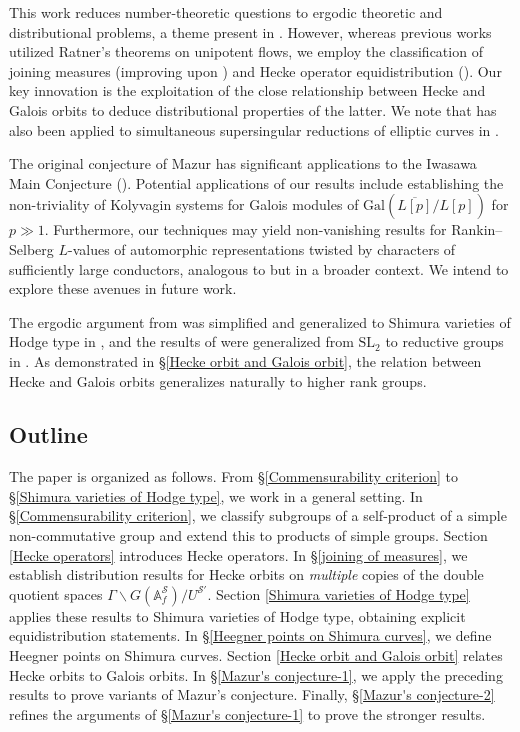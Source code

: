 \documentclass[11pt,oneside,reqno]{amsart}
\newcommand{\Gal}{\mathrm{Gal}}
\newcommand{\A}{\mathbb{A}}
\newcommand{\Scal}{\mathcal{S}}
\theoremstyle{plain}
\begin{document}
	This work reduces number-theoretic questions to ergodic theoretic and distributional problems, a theme present in \cite{Cornut2002,Vatsal2002,CornutVatsal2005,CornutVatsal2007}. However, whereas previous works utilized Ratner's theorems on unipotent flows, we employ the classification of joining measures (improving upon \cite{EinsiedlerLindenstrauss2019}) and Hecke operator equidistribution (\cite{ClozelOhUllmo2001}). Our key innovation is the exploitation of the close relationship between Hecke and Galois orbits to deduce distributional properties of the latter. We note that \cite{EinsiedlerLindenstrauss2019} has also been applied to simultaneous supersingular reductions of elliptic curves in \cite{AkaLuethiMichelWieser2022}.
	
	The original conjecture of Mazur has significant applications to the Iwasawa Main Conjecture (\cite{Bertolini1995,NekovarSchappacher1999,Howard2004b}). Potential applications of our results include establishing the non-triviality of Kolyvagin systems for Galois modules of $\Gal(\overline{L[p]}/L[p])$ for $p\gg1$. Furthermore, our techniques may yield non-vanishing results for Rankin--Selberg $L$-values of automorphic representations twisted by characters of sufficiently large conductors, analogous to \cite[Theorem 1.13]{CornutVatsal2007} but in a broader context. We intend to explore these avenues in future work.
	
	The ergodic argument from \cite{Cornut2002} was simplified and generalized to Shimura varieties of Hodge type in \cite{Zhang2025}, and the results of \cite[§2]{CornutVatsal2005} were generalized from $\mathrm{SL}_2$ to reductive groups in \cite[Appendix]{Zhang2025b}. As demonstrated in §\ref{Hecke orbit and Galois orbit}, the relation between Hecke and Galois orbits generalizes naturally to higher rank groups.
	
	\subsection*{Outline}
	The paper is organized as follows. From §\ref{Commensurability criterion} to §\ref{Shimura varieties of Hodge type}, we work in a general setting. In §\ref{Commensurability criterion}, we classify subgroups of a self-product of a simple non-commutative group and extend this to products of simple groups. Section \ref{Hecke operators} introduces Hecke operators. In §\ref{joining of measures}, we establish distribution results for Hecke orbits on \emph{multiple} copies of the double quotient spaces $\Gamma\backslash G(\A_f^\Scal)/U^{\Scal'}$. Section \ref{Shimura varieties of Hodge type} applies these results to Shimura varieties of Hodge type, obtaining explicit equidistribution statements. In §\ref{Heegner points on Shimura curves}, we define Heegner points on Shimura curves. Section \ref{Hecke orbit and Galois orbit} relates Hecke orbits to Galois orbits. In §\ref{Mazur's conjecture-1}, we apply the preceding results to prove variants of Mazur's conjecture. Finally, §\ref{Mazur's conjecture-2} refines the arguments of §\ref{Mazur's conjecture-1} to prove the stronger results.
	
\end{document}
